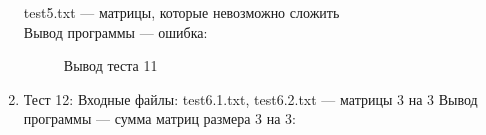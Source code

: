 \documentclass[12pt, a4paper]{article}
\begin{document}
\begin{enumerate}
	test5.txt --- матрицы, которые невозможно сложить\\
	Вывод программы --- ошибка:
	\begin{figure}[h]
  		\caption{Вывод теста 11}
	\end{figure}
	\newpage
	\item Тест 12: Входные файлы: test6.1.txt, 
	test6.2.txt --- матрицы 3 на 3
	Вывод программы --- сумма матриц размера 3 на 3:
	\begin{figure}[h]

\end{figure}
\end{enumerate}
\end{document}
